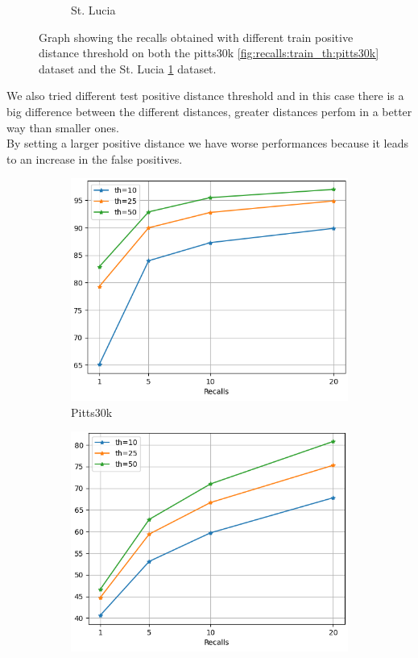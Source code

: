 \documentclass[10pt,twocolumn,letterpaper]{article}
\begin{document}
\begin{figure}[!h]
\begin{subfigure}[b]{0.23\textwidth}
		\caption{St. Lucia}
		\label{fig:recalls:train_th:st_lucia}
	\end{subfigure}
	\caption{Graph showing the recalls obtained with different train positive distance threshold on both the pitts30k \ref{fig:recalls:train_th:pitts30k} dataset and the St. Lucia \ref{fig:recalls:train_th:st_lucia} dataset.}
	\label{fig:recalls:train_th}
\end{figure}
We also tried different test positive distance threshold and in this case there is a big difference between the different distances, greater distances perfom in a better way than smaller ones.\\
By setting a larger positive distance we have worse performances because it leads to an increase in the false positives.
\begin{figure}[!h]
	\centering
	\begin{subfigure}[b]{0.23\textwidth}
		\centering
		\includegraphics[width=\textwidth]{img/test_th/test_pitts30k_recalls_graph.png}
		\caption{Pitts30k}
		\label{fig:recalls:test_th:pitts30k}
	\end{subfigure}
	\hfill
	\begin{subfigure}[b]{0.23\textwidth}
		\centering
		\includegraphics[width=\textwidth]{img/test_th/test_st_lucia_recalls_graph.png}

\end{subfigure}
\end{figure}
\end{document}
